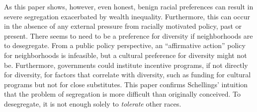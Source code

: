 \documentclass[11pt]{asaproc}
\newcommand{\1}{\mathbb{1}}
\begin{document}
As this paper shows, however, even honest, benign racial preferences can result in severe segregation exacerbated by wealth inequality. Furthermore, this can occur in the absence of any external pressure from racially motivated policy, past or present. There seems to need to be a preference for diversity if neighborhoods are to desegregate. From a public policy perspective, an ``affirmative action'' policy for neighborhoods is infeasible, but a cultural preference for diversity might not be. Furthermore, governments could institute incentive programs, if not directly for diversity, for factors that correlate with diversity, such as funding for cultural programs but not for close substitutes. This paper confirms Schellings' intuition that the problem of segregation is more difficult than originally conceived. To desegregate, it is not enough solely to \textit{tolerate} other races.





\end{document}
